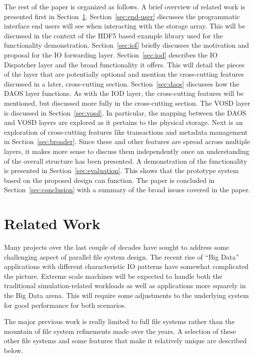 \documentclass[conference]{IEEEtran}
\begin{document}
The rest of the paper is organized as follows. A brief overview of related work
is presented first in Section~\ref{sec:related}. Section~\ref{sec:end-user}
discusses the programmatic interface end users will see when interacting with
the storage array. This will be discussed in the context of the HDF5 based
example library used for the functionality demonstration. Section~\ref{sec:iof}
briefly discusses the motivation and proposal for the IO forwarding layer.
Section~\ref{sec:iod} describes the IO Dispatcher layer and the broad
functionality it offers. This will detail the pieces of the layer that are
potentially optional and mention the cross-cutting features discussed in a
later, cross-cutting section. Section~\ref{sec:daos} discusses how the DAOS
layer functions. As with the IOD layer, the cross-cutting features will be
mentioned, but discussed more fully in the cross-cutting section. The VOSD
layer is discussed in Section~\ref{sec:vosd}. In particular, the mapping
between the DAOS and VOSD layers are explored as it pertains to the physical
storage. Next is an exploration of cross-cutting features like transactions and
metadata management in Section~\ref{sec:broader}. Since these and other
features are spread across multiple layers, it makes more sense to discuss them
independently once an understanding of the overall structure has been
presented.  A demonstration of the functionality is presented in
Section~\ref{sec:evaluation}. This shows that the prototype system based on the
proposed design can function. The paper is concluded in
Section~\ref{sec:conclusion} with a summary of the broad issues covered in the
paper.

\section{Related Work}
\label{sec:related}

Many projects over the last couple of decades have sought to address some
challenging aspect of parallel file system design. The recent rise of ``Big
Data'' applications with different characteristic IO patterns have somewhat
complicated the picture. Extreme scale machines will be expected to handle both
the traditional simulation-related workloads as well as applications more
squarely in the Big Data arena. This will require some adjustments to the
underlying system for good performance for both scenarios.

The major previous work is really limited to full file systems rather than the
mountain of file system refinements made over the years. A selection of these
other file systems and some features that make it relatively unique are
described below.
\end{document}

